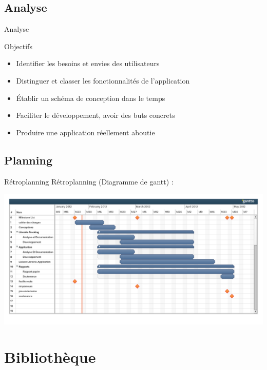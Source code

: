 \documentclass{beamer}
\begin{document}
	\subsection{Analyse}
		\begin{frame}{Analyse}
			\begin{exampleblock}{Objectifs}
				\begin{itemize}
					\item{Identifier les besoins et envies des utilisateurs}
					\item{Distinguer et classer les fonctionnalités de l'application}
					\item{Établir un schéma de conception dans le temps}
					\item{Faciliter le développement, avoir des buts concrets}
					\item{Produire une application réellement aboutie}
				\end{itemize}
			\end{exampleblock}
		\end{frame}
	
	\subsection{Planning}
		\begin{frame}{Rétroplanning}	
			Rétroplanning (Diagramme de gantt) :
			\begin{center}
			\includegraphics[scale=0.25]{../feuille-route/retroplanning.pdf}
			\end{center}
		\end{frame}
	
	\section{Bibliothèque}
\end{document}
